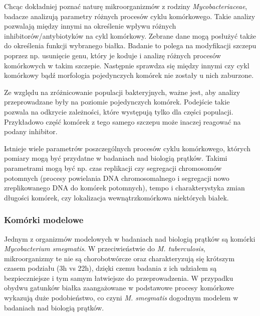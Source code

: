 \documentclass[declaration,shortabstract,mgr]{iithesis}
\begin{document}
Chcąc dokładniej poznać naturę mikroorganizmów z rodziny \emph{Mycobacteriaceae}, badacze analizują parametry różnych procesów cyklu komórkowego.
Takie analizy pozwalają między innymi na określenie wpływu różnych inhibitorów/antybiotyków na cykl komórkowy\cite{paper:watching-dna-replication}.
Zebrane dane mogą posłużyć także do określenia funkcji wybranego białka\cite{paper:protein-responsibility}.
Badanie to polega na modyfikacji szczepu poprzez np. usunięcie genu, który je koduje i analizę różnych procesów komórkowych w takim szczepie.
Następnie sprawdza się między innymi czy cykl komórkowy bądź morfologia pojedynczych komórek nie zostały u nich zaburzone.

Ze względu na zróżnicowanie populacji bakteryjnych, ważne jest, aby analizy przeprowadzane były na poziomie pojedynczych komórek.
Podejście takie pozwala na odkrycie zależności, które występują tylko dla części populacji.
Przykładowo część komórek z tego samego szczepu może inaczej reagować na podany inhibitor.

Istnieje wiele parametrów poszczególnych procesów cyklu komórkowego, których pomiary mogą być przydatne w badaniach nad biologią prątków.
Takimi parametrami mogą być np. czas replikacji czy segregacji chromosomów potomnych (procesy powielania DNA chromosomalnego i segregacji nowo zreplikowanego DNA do komórek potomnych), tempo i charakterystyka zmian długości komórek, czy lokalizacja wewnątrzkomórkowa niektórych białek.

\subsubsection{Komórki modelowe}

Jednym z organizmów modelowych w badaniach nad biologią prątków są komórki \emph{Mycobacterium smegmatis}.
W przeciwieństwie do \emph{M. tuberculosis}, mikroorganizmy te nie są chorobotwórcze oraz charakteryzują się krótszym czasem podziału (3h vs 22h), dzięki czemu badania z ich udziałem są bezpieczniejsze i tym samym łatwiejsze do przeprowadzenia.
W przypadku obydwu gatunków białka zaangażowane w podstawowe procesy komórkowe wykazują duże podobieństwo, co czyni \emph{M. smegmatis} dogodnym modelem w badaniach nad biologią prątków.
\end{document}
